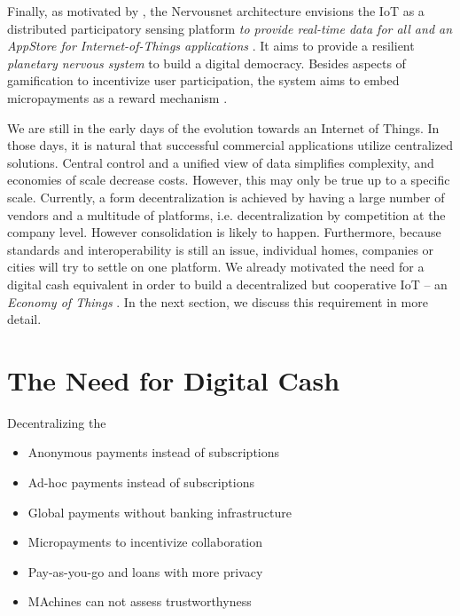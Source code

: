 Finally, as motivated by \cite{Giannotti2012}, the Nervousnet architecture envisions the IoT as a distributed participatory sensing platform \emph{to provide real-time data for all and an AppStore for Internet-of-Things applications} \parencite{7097988}. It aims to provide a resilient \emph{planetary nervous system} to build a digital democracy. Besides aspects of gamification to incentivize user participation, the system aims to embed micropayments as a reward mechanism \parencite{Helbing2015Nature}.

We are still in the early days of the evolution towards an Internet of Things. In those days, it is natural that successful commercial applications utilize centralized solutions. Central control and a unified view of data simplifies complexity, and economies of scale decrease costs. However, this may only be true up to a specific scale. Currently, a form decentralization is achieved by having a large number of vendors and a multitude of platforms, i.e. decentralization by competition at the company level. However consolidation is likely to happen. Furthermore, because standards and interoperability is still an issue, individual homes, companies or cities will try to settle on one platform.
We already motivated the need for a digital cash equivalent in order to build a decentralized but cooperative IoT -- an \emph{Economy of Things} \parencite{Pureswaran2015}. In the next section, we discuss this requirement in more detail.


\section{The Need for Digital Cash}

Decentralizing the 

\begin{itemize}
\item Anonymous payments instead of subscriptions
\item Ad-hoc payments instead of subscriptions
\item Global payments without banking infrastructure
\item Micropayments to incentivize collaboration
\item Pay-as-you-go and loans with more privacy
\item MAchines can not assess trustworthyness

\end{itemize}


  



